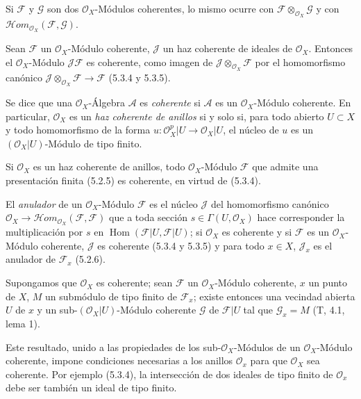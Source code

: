 \begin{env}[5.3.5]
\label{0.5.3.5-fr}
Si $\mathcal{F}$ y $\mathcal{G}$ son dos $\mathcal{O}_X$-Módulos coherentes,
lo mismo ocurre con $\mathcal{F}\otimes_{\mathcal{O}_X}\mathcal{G}$ y con
$\mathcal{H}\!om_{\mathcal{O}_X}(\mathcal{F},\mathcal{G})$.
\end{env}

\begin{env}[5.3.6]
\label{0.5.3.6-fr}
Sean $\mathcal{F}$ un $\mathcal{O}_X$-Módulo coherente, $\mathcal{J}$ un
haz coherente de ideales de $\mathcal{O}_X$. Entonces el
$\mathcal{O}_X$-Módulo $\mathcal{J}\mathcal{F}$ es coherente, como imagen
de $\mathcal{J}\otimes_{\mathcal{O}_X}\mathcal{F}$ por el homomorfismo
canónico
$\mathcal{J}\otimes_{\mathcal{O}_X}\mathcal{F}\to\mathcal{F}$
(5.3.4 y 5.3.5).
\end{env}

\begin{env}[5.3.7]
\label{0.5.3.7-fr}
Se dice que una $\mathcal{O}_X$-Álgebra $\mathcal{A}$ es \emph{coherente} si
$\mathcal{A}$ es un $\mathcal{O}_X$-Módulo coherente. En particular,
$\mathcal{O}_X$ es un \emph{haz coherente de anillos} si y solo si,
para todo abierto $U\subset X$ y todo homomorfismo de la forma
$u:\mathcal{O}_X^p|U\to\mathcal{O}_X|U$, el núcleo de $u$ es un
$(\mathcal{O}_X|U)$-Módulo de tipo finito.

Si $\mathcal{O}_X$ es un haz coherente de anillos, todo
$\mathcal{O}_X$-Módulo $\mathcal{F}$ que admite una presentación finita (5.2.5)
es coherente, en virtud de (5.3.4).

El \emph{anulador} de un $\mathcal{O}_X$-Módulo $\mathcal{F}$ es el núcleo
$\mathcal{J}$ del homomorfismo canónico
$\mathcal{O}_X\to\mathcal{H}\!om_{\mathcal{O}_X}(\mathcal{F},\mathcal{F})$
que a toda sección $s\in\Gamma(U,\mathcal{O}_X)$ hace corresponder la
multiplicación por $s$ en
$\operatorname{Hom}(\mathcal{F}|U,\mathcal{F}|U)$; si $\mathcal{O}_X$ es
coherente y si $\mathcal{F}$ es un $\mathcal{O}_X$-Módulo coherente,
$\mathcal{J}$ es coherente (5.3.4 y 5.3.5) y para todo $x\in X$,
$\mathcal{J}_x$ es el anulador de $\mathcal{F}_x$ (5.2.6).
\end{env}


\begin{env}[5.3.8]
\label{0.5.3.8-fr}
Supongamos que $\mathcal{O}_X$ es coherente; sean $\mathcal{F}$ un
$\mathcal{O}_X$-Módulo coherente, $x$ un punto de $X$, $M$ un submódulo de
tipo finito de $\mathcal{F}_x$; existe entonces una vecindad abierta $U$ de $x$
y un sub-$(\mathcal{O}_X|U)$-Módulo coherente $\mathcal{G}$ de
$\mathcal{F}|U$ tal que $\mathcal{G}_x=M$ (T, 4.1, lema 1).

Este resultado, unido a las propiedades de los sub-$\mathcal{O}_X$-Módulos de un
$\mathcal{O}_X$-Módulo coherente, impone condiciones necesarias a los anillos
$\mathcal{O}_x$ para que $\mathcal{O}_X$ sea coherente. Por ejemplo (5.3.4),
la intersección de dos ideales de tipo finito de $\mathcal{O}_x$ debe ser también
un ideal de tipo finito.
\end{env}

